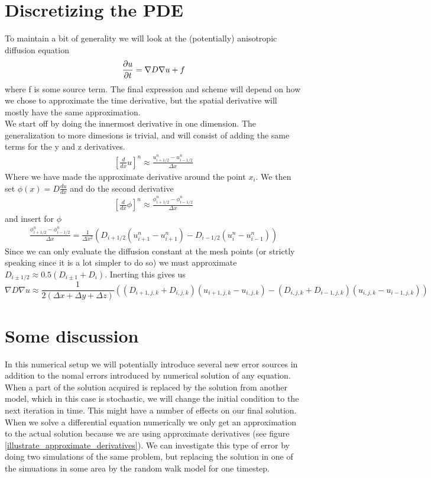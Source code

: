 \section{Discretizing the PDE}
To maintain a bit of generality we will look at the (potentially) anisotropic diffusion equation
\begin{equation}
 \frac{\partial u}{\partial t} = \nabla D\nabla u +f
\end{equation}
where f is some source term. 
The final expression and scheme will depend on how we chose to approximate the time derivative, but the spatial derivative will mostly have the same approximation. \\
We start off by doing the innermost derivative in one dimension. 
The generalization to more dimesions is trivial, and will consist of adding the same terms for the y and z derivatives. 
\begin{align*}
 \left[\frac{d}{dx}u\right]^n \approx \frac{u^n_{i+1/2}-u^n_{i-1/2}}{\Delta x}
\end{align*}
Where we have made the approximate derivative around the point $x_i$. 
We then set $\phi(x)=D\frac{du}{dx}$ and do the second derivative
\begin{align*}
  \left[\frac{d}{dx}\phi\right]^n \approx \frac{\phi^n_{i+1/2}-\phi^n_{i-1/2}}{\Delta x}
\end{align*}
and insert for $\phi$
\begin{align*}
 \frac{\phi^n_{i+1/2}-\phi^n_{i-1/2}}{\Delta x} = \frac{1}{\Delta x^2}\left(D_{i+1/2}(u^n_{i+1}-u^n_{i+1}) -D_{i-1/2}(u^n_{i}-u^n_{i-1})\right)
\end{align*}
Since we can only evaluate the diffusion constant at the mesh points (or strictly speaking since it is a lot simpler to do so) we must approximate $D_{i\pm1/2}\approx0.5(D_{i\pm1}+D_i)$. 
Inerting this gives us 
\begin{equation}
 \nabla D\nabla u\approx\frac{1}{2(\Delta x+\Delta y+\Delta z)}\left((D_{i+1,j,k}+D_{i,j,k})(u_{i+1,j,k}-u_{i,j,k})-(D_{i,j,k}+D_{i-1,j,k})(u_{i,j,k}-u_{i-1,j,k})\right)
\end{equation}


\section{Some discussion}
In this numerical setup we will potentially introduce several new error sources in addition to the nomal errors introduced by numerical solution of any equation. 
When a part of the solution acquired is replaced by the solution from another model, which in this case is stochastic, we will change the initial condition to the next iteration in time. 
This might have a number of effects on our final solution. 
When we solve a differential equation numerically we only get an approximation to the actual solution because we are using approximate derivatives (see figure \ref{illustrate_approximate_derivatives}). 
We can investigate this type of error by doing two simulations of the same problem, but replacing the solution in one of the simuations in some area by the random walk model for one timestep. 

